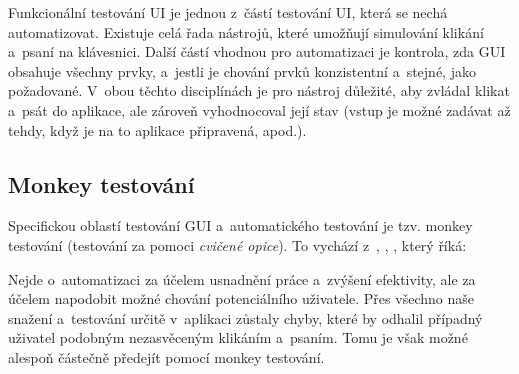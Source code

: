 		Funkcionální testování UI je jednou z~částí testování UI, která se nechá automatizovat. Existuje celá řada nástrojů, které umožňují simulování klikání a~psaní na klávesnici. Další částí vhodnou pro automatizaci je kontrola, zda GUI obsahuje všechny prvky, a~jestli je chování prvků konzistentní a~stejné, jako požadované. V~obou těchto disciplínách je pro nástroj důležité, aby zvládal klikat a~psát do aplikace, ale zároveň vyhodnocoval její stav (vstup je možné zadávat až tehdy, když je na to aplikace připravená, apod.).
		
			\subsection{Monkey testování}\label{MonkeyTestovani}
			Specifickou oblastí testování GUI a~automatického testování je tzv. monkey testování (testování za pomoci \emph{cvičené opice}). To vychází z~, \citep{Patton}, \citep{Teorem}, který říká: 
			
			Nejde o~automatizaci za účelem usnadnění práce a~zvýšení efektivity, ale za účelem napodobit možné chování potenciálního uživatele. Přes všechno naše snažení a~testování určitě v~aplikaci zůstaly chyby, které by odhalil případný uživatel podobným nezasvěceným klikáním a~psaním. Tomu je však možné alespoň částečně předejít pomocí monkey testování.
